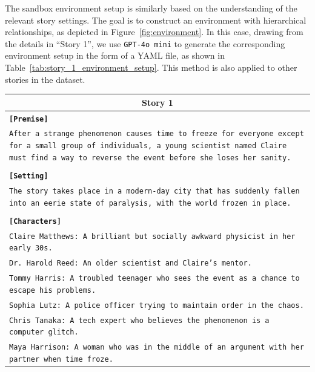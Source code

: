 \documentclass[letterpaper]{article} %
\begin{document}
The sandbox environment setup is similarly based on the understanding of the relevant story settings. The goal is to construct an environment with hierarchical relationships, as depicted in Figure~\ref{fig:environment}. In this case, drawing from the details in ``Story 1'', we use \texttt{GPT-4o mini} to generate the corresponding environment setup in the form of a YAML file, as shown in Table~\ref{tab:story_1_environment_setup}. This method is also applied to other stories in the dataset.

\onecolumn
\begin{small}
  \begin{longtable}{p{\textwidth}}
    \toprule
    \multicolumn{1}{c}{\textbf{Story 1}} \\
    \midrule
    \texttt{\textbf{[Premise]}} \\
    \texttt{After a strange phenomenon causes time to freeze for everyone except for a small group of individuals, a young scientist named Claire must find a way to reverse the event before she loses her sanity.} \\\\
    \texttt{\textbf{[Setting]}} \\
    \texttt{The story takes place in a modern-day city that has suddenly fallen into an eerie state of paralysis, with the world frozen in place.} \\\\
    \texttt{\textbf{[Characters]}} \\
    \texttt{Claire Matthews: A brilliant but socially awkward physicist in her early 30s.} \\
    \texttt{Dr. Harold Reed: An older scientist and Claire's mentor.} \\
    \texttt{Tommy Harris: A troubled teenager who sees the event as a chance to escape his problems.} \\
    \texttt{Sophia Lutz: A police officer trying to maintain order in the chaos.} \\
    \texttt{Chris Tanaka: A tech expert who believes the phenomenon is a computer glitch.} \\
    \texttt{Maya Harrison: A woman who was in the middle of an argument with her partner when time froze.} \\
    \midrule


\end{longtable}
\end{small}
\end{document}
